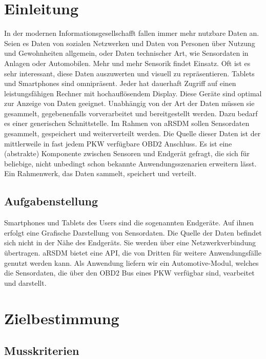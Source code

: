 \documentclass[pflichtenheft.tex]{subfiles}
\begin{document}
\chapter{Einleitung}

In der modernen Informationsgesellschafft fallen immer mehr nutzbare Daten an. Seien es Daten von sozialen Netzwerken und Daten von Personen über Nutzung und Gewohnheiten allgemein, oder Daten technischer Art, wie Sensordaten in Anlagen oder Automobilen. Mehr und mehr Sensorik findet Einsatz. Oft ist es sehr interessant, diese Daten auszuwerten und visuell zu repräsentieren. Tablets und Smartphones sind omnipräsent. Jeder hat dauerhaft Zugriff auf einen leistungsfähigen Rechner mit hochauflösendem Display. Diese Geräte sind optimal zur Anzeige von Daten geeignet. Unabhängig von der Art der Daten müssen sie gesammelt, gegebenenfalls vorverarbeitet und bereitgestellt werden. Dazu bedarf es einer generischen Schnittstelle. Im Rahmen von aRSDM sollen Sensordaten gesammelt, gespeichert und weiterverteilt werden. Die Quelle dieser Daten ist der mittlerweile in fast jedem PKW verfügbare OBD2 Anschluss. Es ist eine (abstrakte) Komponente zwischen Sensoren und Endgerät gefragt, die sich für beliebige, nicht unbedingt schon bekannte Anwendungsszenarien erweitern lässt. Ein Rahmenwerk, das Daten sammelt, speichert und verteilt.

\section{Aufgabenstellung}

Smartphones und Tablets des Users sind die sogenannten Endgeräte. Auf ihnen erfolgt eine Grafische Darstellung von Sensordaten. Die Quelle der Daten befindet sich nicht in der Nähe des Endgeräts. Sie werden über eine Netzwerkverbindung übertragen. aRSDM bietet eine API, die von Dritten für weitere Anwendungsfälle genutzt werden kann. Als Anwendung liefern wir ein Automotive-Modul, welches die Sensordaten, die über den OBD2 Bus eines PKW verfügbar sind, vearbeitet und darstellt.


\chapter{Zielbestimmung}

\section{Musskriterien}
\end{document}
